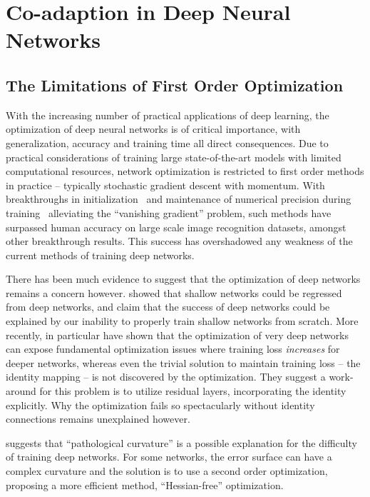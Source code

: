 \documentclass[thesis]{subfiles}
\begin{document}
    
    \chapter{Co-adaption in Deep Neural Networks}
    \label{pairablation}

\section{The Limitations of First Order Optimization}
With the increasing number of practical applications of deep learning, the optimization of deep neural networks is of critical importance, with generalization, accuracy and training time all direct consequences. Due to practical considerations of training large state-of-the-art models with limited computational resources, network optimization is restricted to first order methods in practice -- typically stochastic gradient descent with momentum. With breakthroughs in initialization~\citep{glorot2010understanding,He2015b} and maintenance of numerical precision during training~\citep{Ioffe2015} alleviating the ``vanishing gradient'' problem, such methods have surpassed human accuracy on large scale image recognition datasets, amongst other breakthrough results. This success has overshadowed any weakness of the current methods of training deep networks.

There has been much evidence to suggest that the optimization of deep networks remains a concern however. \citet{Ba2013dothey} showed that shallow networks could be regressed from deep networks, and claim that the success of deep networks could be explained by our inability to properly train shallow networks from scratch. More recently, \citet{He2015,He2016} in particular have shown that the optimization of very deep networks can expose fundamental optimization issues where training loss \emph{increases} for deeper networks, whereas even the trivial solution to maintain training loss -- the identity mapping -- is not discovered by the optimization. They suggest a work-around for this problem is to utilize residual layers, incorporating the identity explicitly. Why the optimization fails so spectacularly without identity connections remains unexplained however.

\citet{martens2010deep} suggests that ``pathological curvature'' is a possible explanation for the difficulty of training deep networks. For some networks, the error surface can have a complex curvature  and the solution is to use a second order optimization, proposing a more efficient method, ``Hessian-free'' optimization.
\end{document}
